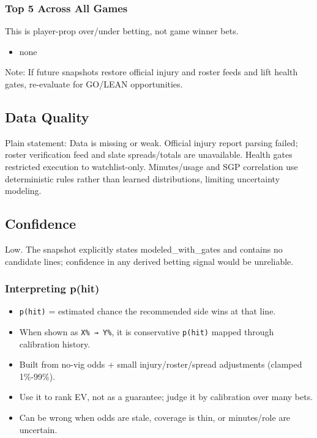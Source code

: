 \documentclass[10pt]{article}
\begin{document}
\subsubsection*{Top 5 Across All Games}

This is player-prop over/under betting, not game winner bets.

\begin{itemize}
\item none
\end{itemize}

Note: If future snapshots restore official injury and roster feeds and lift health gates, re-evaluate for GO/LEAN opportunities.

\newpage

\subsection*{Data Quality}
Plain statement: Data is missing or weak. Official injury report parsing failed; roster verification feed and slate spreads/totals are unavailable. Health gates restricted execution to watchlist-only. Minutes/usage and SGP correlation use deterministic rules rather than learned distributions, limiting uncertainty modeling.

\subsection*{Confidence}
Low. The snapshot explicitly states modeled\_with\_gates and contains no candidate lines; confidence in any derived betting signal would be unreliable.

\subsubsection*{Interpreting p(hit)}

\begin{itemize}
\item \texttt{p(hit)} = estimated chance the recommended side wins at that line.
\item When shown as \texttt{X\% → Y\%}, it is conservative \texttt{p(hit)} mapped through calibration history.
\item Built from no-vig odds + small injury/roster/spread adjustments (clamped 1\%-99\%).
\item Use it to rank EV, not as a guarantee; judge it by calibration over many bets.
\item Can be wrong when odds are stale, coverage is thin, or minutes/role are uncertain.
\end{itemize}
\end{document}
